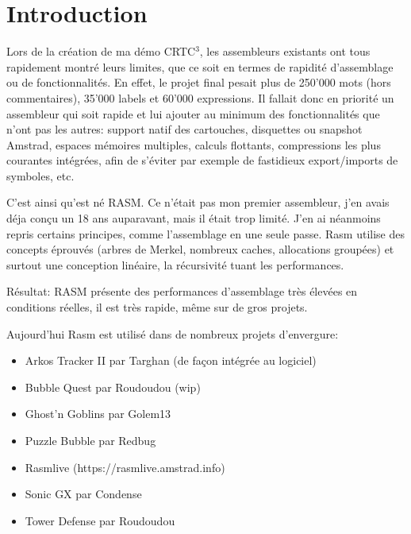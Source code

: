 \section{Introduction}

\begin{xfr}
Lors de la création de ma démo CRTC$^3$, les assembleurs existants ont tous rapidement montré leurs limites, que ce soit en termes de rapidité d'assemblage ou de fonctionnalités.
En effet, le projet final pesait plus de 250'000 mots (hors commentaires), 35'000 labels et 60'000 expressions.
Il fallait donc en priorité un assembleur qui soit rapide et lui ajouter au minimum des fonctionnalités que n'ont pas les autres: support natif des cartouches, disquettes ou snapshot Amstrad, espaces mémoires multiples, calculs flottants, compressions les plus courantes intégrées, afin de s'éviter par exemple de fastidieux export/imports de symboles, etc.

\medskip
C'est ainsi qu'est né RASM. Ce n'était pas mon premier assembleur, j'en avais déja conçu un 18 ans auparavant, mais il était trop limité. J'en ai néanmoins repris certains principes, comme l'assemblage en une seule passe. Rasm utilise des concepts éprouvés (arbres de Merkel, nombreux caches, allocations groupées) et surtout une conception linéaire, la récursivité tuant les performances.

Résultat: RASM présente des performances d'assemblage très élevées en conditions réelles, il est très rapide, même sur de gros projets. %

\medskip
Aujourd'hui Rasm est utilisé dans de nombreux projets d'envergure:
\begin{itemize}[noitemsep]
\item Arkos Tracker II par Targhan (de façon intégrée au logiciel)
\item Bubble Quest par Roudoudou (wip)
\item Ghost'n Goblins par Golem13
\item Puzzle Bubble par Redbug
\item Rasmlive (https://rasmlive.amstrad.info)
\item Sonic GX par Condense 
\item Tower Defense par Roudoudou
\end{itemize}

\end{xfr}

